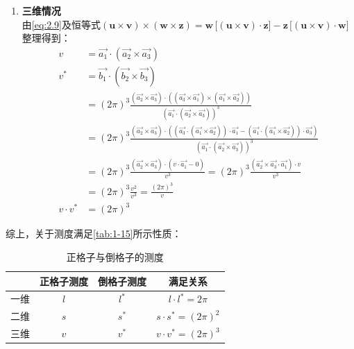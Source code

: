 \begin{enumerate}[itemsep=0pt,parsep=0pt]
        \item \textbf{三维情况}\\
        由\autoref{eq:2.9}及恒等式$
        (\mathbf{u} \times \mathbf{v}) \times (\mathbf{w} \times \mathbf{z})
        = \mathbf{w}\,\big[(\mathbf{u} \times \mathbf{v}) \cdot \mathbf{z}\big]
        - \mathbf{z}\,\big[(\mathbf{u} \times \mathbf{v}) \cdot \mathbf{w}\big]
        $整理得到：
        \begin{align*}
            v      &= \vec{a_1} \cdot (\vec{a_2}\times \vec{a_3})\\
            v^\ast &= \vec{b_1} \cdot (\vec{b_2}\times \vec{b_3})\\
                   &= (2\pi)^3 \frac{(\vec{a_2}\times \vec{a_3})\cdot ((\vec{a_3}\times \vec{a_1})\times (\vec{a_1}\times \vec{a_2}))}{(\vec{a_1}\cdot (\vec{a_2}\times \vec{a_3}))^3}\\
                   &= (2\pi)^3 \frac{(\vec{a_2}\times \vec{a_3})\cdot ((\vec{a_3}\cdot(\vec{a_1}\times \vec{a_2}))\cdot \vec{a_1}-(\vec{a_1}\cdot(\vec{a_1}\times \vec{a_2}))\cdot \vec{a_3})}{(\vec{a_1}\cdot (\vec{a_2}\times \vec{a_3}))^3}\\
                   &= (2\pi)^3 \frac{(\vec{a_2}\times \vec{a_3})\cdot (v\cdot \vec{a_1}-0)}{v^3}=(2\pi)^3 \frac{(\vec{a_2}\times \vec{a_3}\cdot \vec{a_1})\cdot v}{v^3}\\
                   &= (2\pi)^3 \frac{v^2}{v^3} = \frac{(2\pi)^3}{v}\\
            v\cdot v^\ast   &= (2\pi)^3
        \end{align*}
        
    \end{enumerate}

    综上，关于测度满足\autoref{tab:1-15}所示性质：
    \begin{table}[!htbp]
    \centering
    \setlength{\tabcolsep}{1em}
    \begin{tabular}{cccc}
        \toprule
                & 正格子测度 & 倒格子测度 & 满足关系 \\
        \midrule
        一维 &  $l$      & $l^\ast $ & $l\cdot l^\ast = 2\pi $ \\
        二维 &  $s$      & $s^\ast $ & $s\cdot s^\ast = (2\pi)^2 $ \\
        三维 &  $v$      & $v^\ast $ & $v\cdot v^\ast = (2\pi)^3 $ \\
        \bottomrule
    \end{tabular}
    \caption{正格子与倒格子的测度}
    \label{tab:1-15}
    \end{table}


